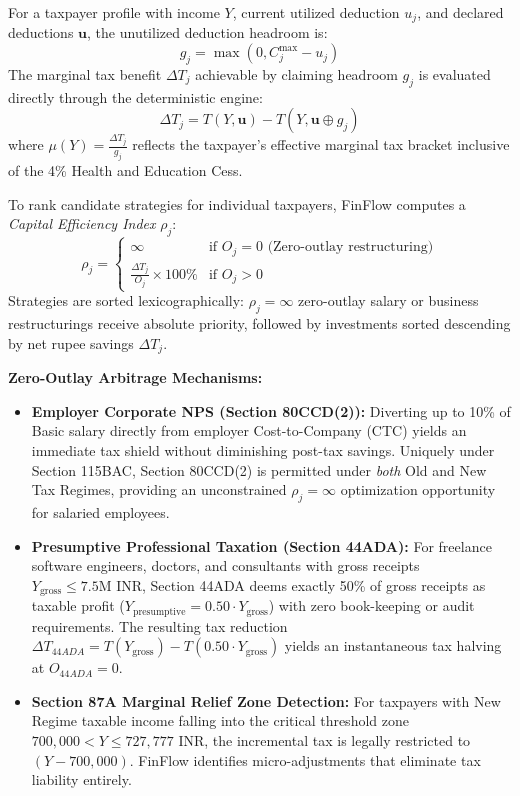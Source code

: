 \documentclass[conference]{IEEEtran}
\begin{document}
For a taxpayer profile with income $Y$, current utilized deduction $u_j$, and declared deductions $\mathbf{u}$, the unutilized deduction headroom is:
\begin{equation}
g_j = \max(0, C_j^{\max} - u_j)
\end{equation}
The marginal tax benefit $\Delta T_j$ achievable by claiming headroom $g_j$ is evaluated directly through the deterministic engine:
\begin{equation}
\Delta T_j = T(Y, \mathbf{u}) - T(Y, \mathbf{u} \oplus g_j)
\end{equation}
where $\mu(Y) = \frac{\Delta T_j}{g_j}$ reflects the taxpayer's effective marginal tax bracket inclusive of the 4\% Health and Education Cess.

To rank candidate strategies for individual taxpayers, FinFlow computes a \textit{Capital Efficiency Index} $\rho_j$:
\begin{equation}
\rho_j = \begin{cases}
\infty & \text{if } O_j = 0 \text{ (Zero-outlay restructuring)} \\
\frac{\Delta T_j}{O_j} \times 100\% & \text{if } O_j > 0
\end{cases}
\end{equation}
Strategies are sorted lexicographically: $\rho_j = \infty$ zero-outlay salary or business restructurings receive absolute priority, followed by investments sorted descending by net rupee savings $\Delta T_j$.

\textbf{Zero-Outlay Arbitrage Mechanisms:}
\begin{itemize}
    \item \textbf{Employer Corporate NPS (Section 80CCD(2)):} Diverting up to 10\% of Basic salary directly from employer Cost-to-Company (CTC) yields an immediate tax shield without diminishing post-tax savings. Uniquely under Section 115BAC, Section 80CCD(2) is permitted under \textit{both} Old and New Tax Regimes, providing an unconstrained $\rho_j = \infty$ optimization opportunity for salaried employees.
    \item \textbf{Presumptive Professional Taxation (Section 44ADA):} For freelance software engineers, doctors, and consultants with gross receipts $Y_{\text{gross}} \le 7.5\text{M INR}$, Section 44ADA deems exactly 50\% of gross receipts as taxable profit ($Y_{\text{presumptive}} = 0.50 \cdot Y_{\text{gross}}$) with zero book-keeping or audit requirements. The resulting tax reduction $\Delta T_{44ADA} = T(Y_{\text{gross}}) - T(0.50 \cdot Y_{\text{gross}})$ yields an instantaneous tax halving at $O_{44ADA} = 0$.
    \item \textbf{Section 87A Marginal Relief Zone Detection:} For taxpayers with New Regime taxable income falling into the critical threshold zone $700,000 < Y \le 727,777$ INR, the incremental tax is legally restricted to $(Y - 700,000)$. FinFlow identifies micro-adjustments that eliminate tax liability entirely.
\end{itemize}
\end{document}
